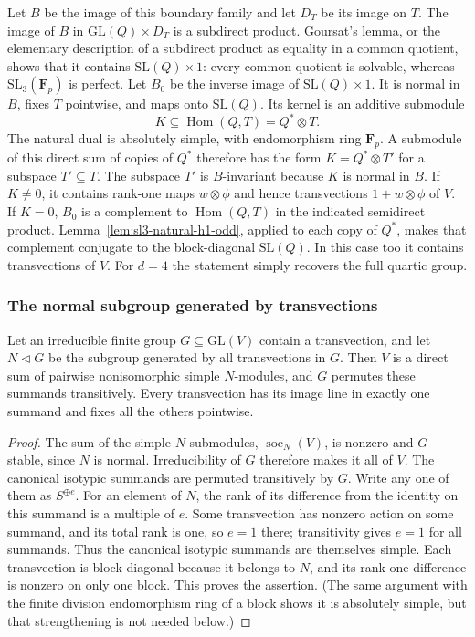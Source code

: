 Let $B$ be the image of this boundary family and let $D_T$ be its
image on $T$.  The image of $B$ in
$\mathrm{GL}(Q)\times D_T$ is a subdirect product.  Goursat's lemma,
or the elementary description of a subdirect product as equality in
a common quotient, shows that it contains
$\mathrm{SL}(Q)\times1$: every common quotient is solvable, whereas
$\mathrm{SL}_3(\mathbf F_p)$ is perfect.  Let $B_0$ be the inverse
image of $\mathrm{SL}(Q)\times1$.  It is normal in $B$, fixes $T$
pointwise, and maps onto $\mathrm{SL}(Q)$.
Its kernel is an additive submodule
\begin{equation}\label{eq:odd-quartic-kernel}
 K\subseteq\operatorname{Hom}(Q,T)=Q^*\otimes T.
\end{equation}
The natural dual is absolutely simple, with endomorphism ring
$\mathbf F_p$.  A submodule of this direct sum of copies of $Q^*$
therefore has the form $K=Q^*\otimes T'$ for a subspace $T'\subseteq T$.
The subspace $T'$ is $B$-invariant because $K$ is normal in $B$.
If $K\ne0$, it contains rank-one maps $w\otimes\phi$ and hence
transvections $1+w\otimes\phi$ of $V$.  If $K=0$, $B_0$ is a
complement to $\operatorname{Hom}(Q,T)$ in the indicated semidirect
product.  Lemma~\ref{lem:sl3-natural-h1-odd}, applied to each copy of
$Q^*$, makes that complement conjugate to the block-diagonal
$\mathrm{SL}(Q)$.  In this case too it contains transvections of $V$.
For $d=4$ the statement simply recovers the full quartic group.

\subsubsection{The normal subgroup generated by transvections}

\begin{lemma}\label{lem:transvection-clifford-blocks}
Let an irreducible finite group $G\subseteq\mathrm{GL}(V)$ contain a
transvection, and let $N\triangleleft G$ be the subgroup generated by
all transvections in $G$.  Then $V$ is a direct sum of pairwise
nonisomorphic simple $N$-modules, and $G$ permutes these summands
transitively.  Every transvection has its image line in exactly one
summand and fixes all the others pointwise.
\end{lemma}

\begin{proof}
The sum of the simple $N$-submodules, $\operatorname{soc}_N(V)$, is
nonzero and $G$-stable, since $N$ is normal.  Irreducibility of $G$
therefore makes it all of $V$.  The canonical isotypic summands are
permuted transitively by $G$.  Write any one of them as $S^{\oplus e}$.
For an element of $N$, the rank of its difference from the identity
on this summand is a multiple of $e$.  Some transvection has nonzero
action on some summand, and its total rank is one, so $e=1$ there;
transitivity gives $e=1$ for all summands.  Thus the canonical
isotypic summands are themselves simple.  Each transvection is
block diagonal because it belongs to $N$, and its rank-one
difference is nonzero on only one block.  This proves the assertion.
(The same argument with the finite division endomorphism ring of a
block shows it is absolutely simple, but that strengthening is not
needed below.)
\end{proof}

